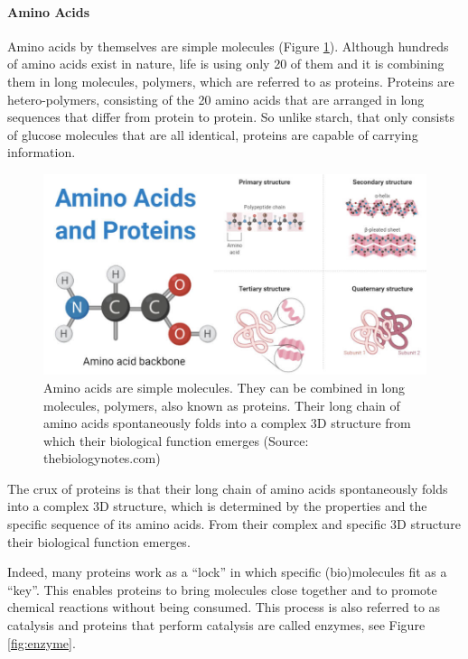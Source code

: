 \documentclass[
  11pt,
]{book}
\begin{document}
\hypertarget{amino-acids}{%
\paragraph{Amino Acids}\label{amino-acids}}

Amino acids by themselves are simple molecules (Figure \ref{fig:aminoAcids}).
Although hundreds of amino acids exist in nature, life is using only 20 of them and it is combining them in long molecules, polymers, which are referred to as proteins.
Proteins are hetero-polymers, consisting of the 20 amino acids that are arranged in long sequences that differ from protein to protein.
So unlike starch, that only consists of glucose molecules that are all identical, proteins are capable of carrying information.



\begin{figure}

{\centering \includegraphics[width=1\linewidth]{./figs/Amino-acids-and-Proteins} 

}

\caption{Amino acids are simple molecules. They can be combined in long molecules, polymers, also known as proteins. Their long chain of amino acids spontaneously folds into a complex 3D structure from which their biological function emerges (Source: thebiologynotes.com)}\label{fig:aminoAcids}
\end{figure}

The crux of proteins is that their long chain of amino acids spontaneously folds into a complex 3D structure, which is determined by the properties and the specific sequence of its amino acids. From their complex and specific 3D structure their biological function emerges.

Indeed, many proteins work as a ``lock'' in which specific (bio)molecules fit as a ``key''. This enables proteins to bring molecules close together and to promote chemical reactions without being consumed. This process is also referred to as catalysis and proteins that perform catalysis are called enzymes, see Figure \ref{fig:enzyme}.
\end{document}
